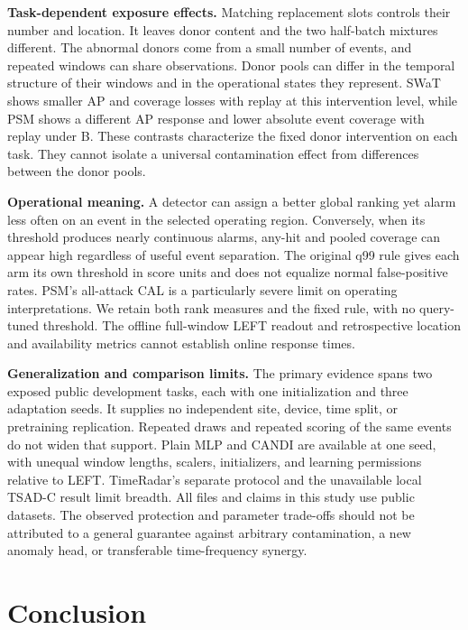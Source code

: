 \documentclass[pdflatex,sn-apa]{sn-jnl}
\begin{document}
\textbf{Task-dependent exposure effects.} Matching replacement slots
controls their number and location. It leaves donor content and the two
half-batch mixtures different. The abnormal donors come from a small
number of events, and repeated windows can share observations. Donor
pools can differ in the temporal structure of their windows and in the
operational states they represent. SWaT shows smaller AP and coverage
losses with replay at this intervention level, while PSM shows a
different AP response and lower absolute event coverage with replay
under B. These contrasts characterize the fixed donor intervention on
each task. They cannot isolate a universal contamination effect from
differences between the donor pools.

\textbf{Operational meaning.} A detector can assign a better global
ranking yet alarm less often on an event in the selected operating
region. Conversely, when its threshold produces nearly continuous
alarms, any-hit and pooled coverage can appear high regardless of useful
event separation. The original q99 rule gives each arm its own threshold
in score units and does not equalize normal false-positive rates. PSM's
all-attack CAL is a particularly severe limit on operating
interpretations. We retain both rank measures and the fixed rule, with
no query-tuned threshold. The offline full-window LEFT readout and
retrospective location and availability metrics cannot establish online
response times.

\textbf{Generalization and comparison limits.} The primary evidence
spans two exposed public development tasks, each with one initialization
and three adaptation seeds. It supplies no independent site, device,
time split, or pretraining replication. Repeated draws and repeated
scoring of the same events do not widen that support. Plain MLP and
CANDI are available at one seed, with unequal window lengths, scalers,
initializers, and learning permissions relative to LEFT. TimeRadar's
separate protocol and the unavailable local TSAD-C result limit breadth.
All files and claims in this study use public datasets. The observed
protection and parameter trade-offs should not be attributed to a
general guarantee against arbitrary contamination, a new anomaly head,
or transferable time-frequency synergy.

\section{Conclusion}\label{conclusion}
\end{document}
